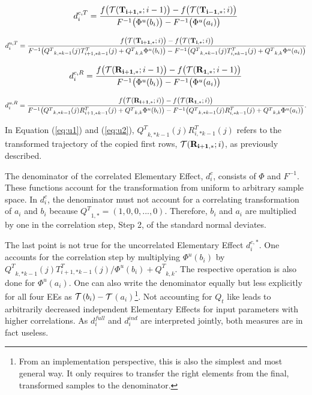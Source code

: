 \documentclass[a4paper,12pt]{article}
\begin{document}
\begin{align}
d_i^{c,T} = \frac{f\big(\mathcal{T}(\bold{T_{i+1,*}}; i-1)\big) - f\big(\mathcal{T}(\bold{T_{i-1,*}}; i)\big)}{F^{-1}\big(\Phi^u(b_i)\big) - F^{-1}\big( \Phi^u(a_i)\big)}
\end{align}

\begin{align} \label{eq:u1}
d_i^{u, T} = \frac{f\big(\mathcal{T}(\bold{T_{i+1,*}}; i)\big) - f\big(\mathcal{T}(\bold{T_{i,*}}; i)\big)}{F^{-1}\big({Q^T}_{k,*k-1}(j)T_{i+1,*k-1}^T(j) + {Q^T}_{k,k} \Phi^u(b_i)\big) - F^{-1}\big({Q^T}_{k,*k-1}(j)T_{i,*k-1}^T(j)+{Q^T}_{k,k} \Phi^u(a_i)\big)}
\end{align}

\begin{align}
d_i^{c, R} = \frac{f\big(\mathcal{T}(\bold{R_{i+1,*}}; i-1)\big) - f\big(\mathcal{T}(\bold{R_{1,*}}; i-1)\big)}{F^{-1}\big( \Phi^u(b_i)\big) - F^{-1}\big( \Phi^u(a_i)\big)}
\end{align}

\begin{align} \label{eq:u2}
d_i^{u, R} = \frac{f\big(\mathcal{T}(\bold{R_{i+1,*}}; i)\big) - f\big(\mathcal{T}(\bold{R_{1,*}}; i)\big)}{F^{-1}\big({Q^T}_{k,*k-1}(j)R_{i+1,*k-1}^T(j) + {Q^T}_{k,k} \Phi^u(b_i)\big) - F^{-1}\big({Q^T}_{k,*k-1}(j)R_{i,*k-1}^T(j)+{Q^T}_{k,k} \Phi^u(a_i)\big)}.
\end{align}

\noindent
In Equation (\ref{eq:u1}) and (\ref{eq:u2}), ${Q^T}_{k,*k-1}(j)R_{i,*k-1}^T(j)$ refers to the transformed trajectory of the copied first rows, $\mathcal{T}(\bold{R_{i+1,*}}; i)$, as previously described.

The denominator of the correlated Elementary Effect, $d_i^{c}$, consists of $\Phi$ and $F^{-1}$. These functions account for the transformation from uniform to arbitrary sample space. In $d_i^{c}$, the denominator must not account for a correlating transformation of $a_i$ and $b_i$ because ${Q^T}_{1,*} = (1, 0, 0, ..., 0)$.  Therefore, $b_i$ and $a_i$ are multiplied by one in the correlation step, Step 2, of the standard normal deviates.

The last point is not true for the uncorrelated Elementary Effect $d_i^{c,*}$. One accounts for the correlation step by multiplying $\Phi^u(b_i)$ by ${Q^T}_{k,*k-1}(j)T_{i+1,*k-1}^T(j)/\Phi^u(b_i)+{Q^T}_{k,k}$. The respective operation is also done for $\Phi^u(a_i)$. One can also write the denominator equally but less explicitly for all four EEs as $\cal{T}$$ (b_i) - \cal{T}$$ (a_i)$\footnote{From an implementation perspective, this is also the simplest and most general way. It only requires to transfer the right elements from the final, transformed samples to the denominator.}. Not accounting for $Q_t$ like \cite{ge2017extending} leads to arbitrarily decreased independent Elementary Effects for input parameters with higher correlations. As $d_i^{full}$ and $d_i^{ind}$ are interpreted jointly, both measures are in fact useless.
\end{document}
